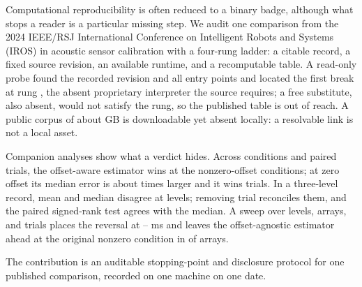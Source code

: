 
Computational reproducibility is often reduced to a binary badge, although
what stops a reader is a particular missing step. We audit one comparison
from the 2024 {IEEE}/{RSJ} International Conference on Intelligent Robots and
Systems ({IROS}) in acoustic sensor calibration with a four-rung ladder: a
citable record, a fixed source revision, an available runtime, and a
recomputable table. A read-only probe found the recorded revision and all
\EntryPoints{} entry points and located the first break at rung \FirstBreak{},
the absent proprietary interpreter the source requires; a free substitute,
also absent, would not satisfy the rung, so the published table is out of
reach. A public corpus of about \CorpusGB{} GB is downloadable yet absent
locally: a resolvable link is not a local asset.

Companion analyses show what a verdict hides.
Across \NConditions{} conditions and \NTrials{} paired trials, the offset-aware
estimator wins at the \NonZeroConditions{} nonzero-offset conditions; at zero
offset its median error is about \ZeroRatio{} times larger and it wins
\ZeroWins{} trials. In a three-level record, mean and median disagree at
\CxDisagreeing{} levels; removing \CxFlipDepth{} trial reconciles them, and the
paired signed-rank test agrees with the median. A sweep over \FineLevels{}
levels, \FineRooms{} arrays, and \FineTrials{} trials places the reversal at
\ReversalLow{}--\ReversalHigh{} ms and leaves the offset-agnostic estimator
ahead at the original nonzero condition in \AnchorAgnosticRooms{} of
\FineRooms{} arrays.

The contribution is an auditable stopping-point and disclosure protocol for one
published comparison, recorded on one machine on one date.
